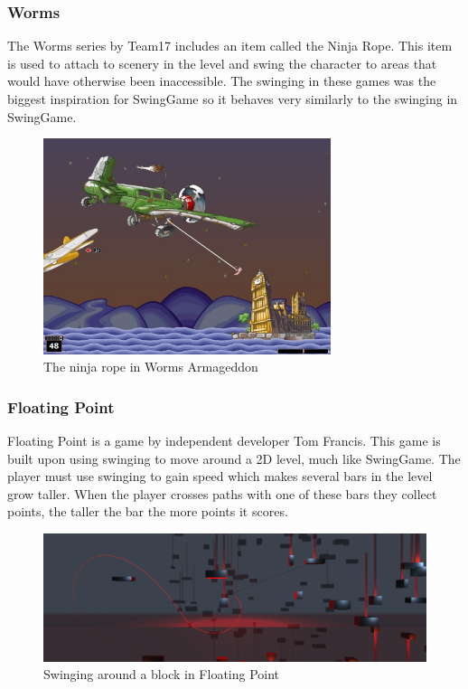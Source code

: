 \documentclass[]{report}
\begin{document}
			\subsubsection{Worms}
			The Worms \cite{worms} series by Team17 includes an item called the Ninja Rope. This item is used to attach to scenery in the level and swing the character to areas that would have otherwise been inaccessible. The swinging in these games was the biggest inspiration for SwingGame so it behaves very similarly to the swinging in SwingGame.
			\begin{figure}[H]
				\centerline{\includegraphics[width=0.75\textwidth]{worms}}
				\caption{The ninja rope in Worms Armageddon  \cite{wormsimage}}
				\label{wormsimage}
			\end{figure}
			\subsubsection{Floating Point}
			Floating Point \cite{floatingpoint} is a game by independent developer Tom Francis. This game is built upon using swinging to move around a 2D level, much like SwingGame. The player must use swinging to gain speed which makes several bars in the level grow taller. When the player crosses paths with one of these bars they collect points, the taller the bar the more points it scores.
			
			\begin{figure}[H]
				\centerline{\includegraphics[width=1.5\textwidth]{floatingpoint}}
				\caption{Swinging around a block in Floating Point \cite{floatingpoint}}
				\label{floatingpointimage}
			\end{figure}
\end{document}
